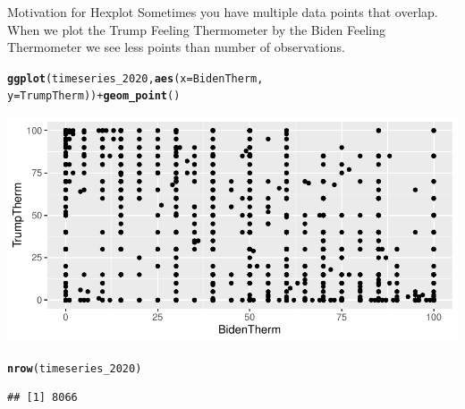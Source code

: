 \documentclass{beamer}\usepackage[]{graphicx}\usepackage[]{color}
\makeatletter
\newcommand{\hlopt}[1]{\textcolor[rgb]{0,0,0}{#1}}%
\newcommand{\hlstd}[1]{\textcolor[rgb]{0.345,0.345,0.345}{#1}}%
\newcommand{\hlkwc}[1]{\textcolor[rgb]{0.333,0.667,0.333}{#1}}%
\newcommand{\hlkwd}[1]{\textcolor[rgb]{0.737,0.353,0.396}{\textbf{#1}}}%
\newenvironment{kframe}{%
 \def\at@end@of@kframe{}%
 \ifinner\ifhmode%
  \def\at@end@of@kframe{\end{minipage}}%
  \begin{minipage}{\columnwidth}%
 \fi\fi%
 \def\FrameCommand##1{\hskip\@totalleftmargin \hskip-\fboxsep
 \colorbox{shadecolor}{##1}\hskip-\fboxsep
     \hskip-\linewidth \hskip-\@totalleftmargin \hskip\columnwidth}%
 \MakeFramed {\advance\hsize-\width
   \@totalleftmargin\z@ \linewidth\hsize
   \@setminipage}}%
 {\par\unskip\endMakeFramed%
 \at@end@of@kframe}
\newenvironment{knitrout}{}{} %
\makeatother
\begin{document}
\begin{frame}[fragile]{Motivation for Hexplot}
Sometimes you have multiple data points that overlap.  When we plot the Trump Feeling Thermometer by the Biden Feeling Thermometer we see less points than number of observations.
\begin{knitrout}
\color{fgcolor}\begin{kframe}
\begin{alltt}
\hlkwd{ggplot}\hlstd{(timeseries_2020,} \hlkwd{aes}\hlstd{(}\hlkwc{x} \hlstd{= BidenTherm,}
    \hlkwc{y} \hlstd{= TrumpTherm))} \hlopt{+} \hlkwd{geom_point}\hlstd{()}
\end{alltt}
\end{kframe}
\includegraphics[width=0.95\linewidth]{figure/unnamed-chunk-61-1} 
\begin{kframe}\begin{alltt}
\hlkwd{nrow}\hlstd{(timeseries_2020)}
\end{alltt}
\begin{verbatim}
## [1] 8066
\end{verbatim}
\end{kframe}
\end{knitrout}
\end{frame}
\end{document}
